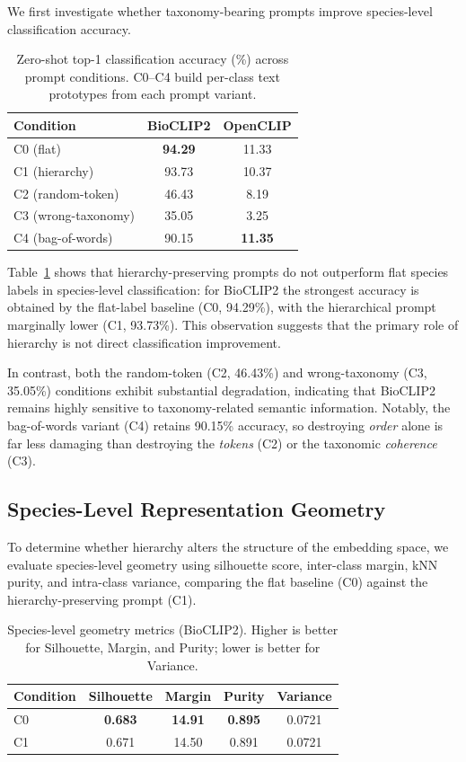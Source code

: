 We first investigate whether taxonomy-bearing prompts improve species-level
classification accuracy.

\begin{table}[t]
\centering
\caption{Zero-shot top-1 classification accuracy (\%) across prompt conditions.
C0--C4 build per-class text prototypes from each prompt variant.}
\label{tab:accuracy}
\begin{tabular}{lcc}
\hline
Condition & BioCLIP2 & OpenCLIP \\
\hline
C0 (flat)             & \textbf{94.29} & 11.33 \\
C1 (hierarchy)        & 93.73 & 10.37 \\
C2 (random-token)     & 46.43 & 8.19 \\
C3 (wrong-taxonomy)   & 35.05 & 3.25 \\
C4 (bag-of-words)     & 90.15 & \textbf{11.35} \\
\hline
\end{tabular}
\end{table}

Table~\ref{tab:accuracy} shows that hierarchy-preserving prompts do not outperform
flat species labels in species-level classification: for BioCLIP2 the strongest
accuracy is obtained by the flat-label baseline (C0, 94.29\%), with the
hierarchical prompt marginally lower (C1, 93.73\%). This observation suggests that
the primary role of hierarchy is not direct classification improvement.

In contrast, both the random-token (C2, 46.43\%) and wrong-taxonomy (C3, 35.05\%)
conditions exhibit substantial degradation, indicating that BioCLIP2 remains highly
sensitive to taxonomy-related semantic information. Notably, the bag-of-words
variant (C4) retains 90.15\% accuracy, so destroying \emph{order} alone is far less
damaging than destroying the \emph{tokens} (C2) or the taxonomic \emph{coherence} (C3).

\subsection{Species-Level Representation Geometry}

To determine whether hierarchy alters the structure of the embedding space, we
evaluate species-level geometry using silhouette score, inter-class margin, kNN
purity, and intra-class variance, comparing the flat baseline (C0) against the
hierarchy-preserving prompt (C1).

\begin{table}[t]
\centering
\caption{Species-level geometry metrics (BioCLIP2). Higher is better for
Silhouette, Margin, and Purity; lower is better for Variance.}
\label{tab:species_geometry}
\begin{tabular}{lcccc}
\hline
Condition & Silhouette & Margin & Purity & Variance \\
\hline
C0 & \textbf{0.683} & \textbf{14.91} & \textbf{0.895} & 0.0721 \\
C1 & 0.671 & 14.50 & 0.891 & 0.0721 \\
\hline
\end{tabular}
\end{table}

